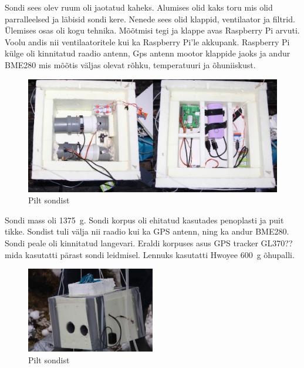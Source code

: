 \documentclass{trkut}%
\begin{document}
Sondi sees olev ruum oli jaotatud kaheks. Alumises olid kaks toru mis olid parralleelsed ja läbisid sondi kere. Nenede sees olid klappid, ventilaator ja filtrid. Ülemises osas oli kogu tehnika. Mõõtmisi tegi ja klappe avas Raspberry Pi arvuti. Voolu andis nii ventilaatoritele kui ka Raspberry Pi'le akkupank. Raspberry Pi külge oli kinnitatud raadio antenn, Gps antenn mootor klappide jaoks ja andur BME280 mis mõõtis väljas olevat rõhku, temperatuuri ja õhuniiskust.
\begin{figure}[h]
	\includegraphics[width=1\textwidth]{PicGra/sond2korrus.jpg}
	\caption{Pilt sondist}
	\label{sond1}
\end{figure}

Sondi mass oli \SI{1375}{g}. Sondi korpus oli ehitatud kasutades penoplasti ja puit tikke. Sondist tuli välja nii raadio kui ka GPS antenn, ning ka andur BME280. Sondi peale oli kinnitatud langevari. Eraldi korpuses asus GPS tracker GL370?? mida kasutatti pärast sondi leidmisel. Lennuks kasutatti Hwoyee \SI{600}{g} õhupalli.
\begin{figure}[h]
	\includegraphics[width=0.5\textwidth]{PicGra/sond.jpg}
	\caption{Pilt sondist}
	\label{sond2}
\end{figure}
\end{document}
